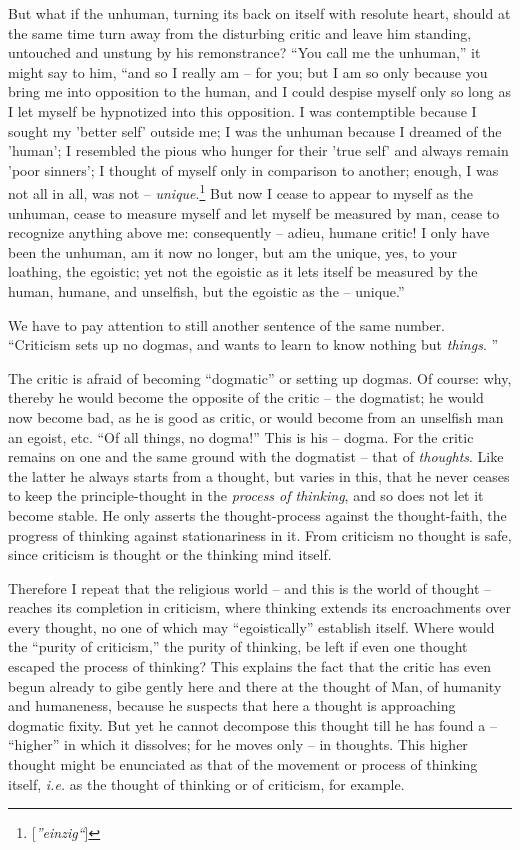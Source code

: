 But what if the unhuman, turning its back on itself with resolute heart, 
should at the same time turn away from the disturbing critic and leave him 
standing, untouched and unstung by his remonstrance? ``You call me the 
unhuman,'' it might say to him, ``and so I really am -- for you; but I am so 
only because you bring me into opposition to the human, and I could despise 
myself only so long as I let myself be hypnotized into this opposition. I was 
contemptible because I sought my 'better self' outside me; I was the unhuman 
because I dreamed of the 'human'; I resembled the pious who hunger for their 
'true self' and always remain 'poor sinners'; I thought of myself only in 
comparison to another; enough, I was not all in all, was not -- 
\textit{unique}.\footnote{[\textit{''einzig``}]} But now I cease to appear 
to myself as the unhuman, cease to measure myself and let myself be measured 
by man, cease to recognize anything above me: consequently -- adieu, humane 
critic! I only have been the unhuman, am it now no longer, but am the unique, 
yes, to your loathing, the egoistic; yet not the egoistic as it lets itself be 
measured by the human, humane, and unselfish, but the egoistic as the -- 
unique.''

We have to pay attention to still another sentence of the same number. 
``Criticism sets up no dogmas, and wants to learn to know nothing but 
\textit{things}. ''

The critic is afraid of becoming ``dogmatic'' or setting up dogmas. Of 
course: why, thereby he would become the opposite of the critic -- the 
dogmatist; he would now become bad, as he is good as critic, or would become 
from an unselfish man an egoist, etc. ``Of all things, no dogma!'' This is 
his -- dogma. For the critic remains on one and the same ground with the 
dogmatist -- that of \textit{thoughts}. Like the latter he always starts from 
a thought, but varies in this, that he never ceases to keep the 
principle-thought in the \textit{process of thinking}, and so does not let it 
become stable. He only asserts the thought-process against the thought-faith, 
the progress of thinking against stationariness in it. From criticism no 
thought is safe, since criticism is thought or the thinking mind itself.

Therefore I repeat that the religious world -- and this is the world of 
thought -- reaches its completion in criticism, where thinking extends its 
encroachments over every thought, no one of which may ``egoistically'' 
establish itself. Where would the ``purity of criticism,'' the purity of 
thinking, be left if even one thought escaped the process of thinking? This 
explains the fact that the critic has even begun already to gibe gently here 
and there at the thought of Man, of humanity and humaneness, because he 
suspects that here a thought is approaching dogmatic fixity. But yet he cannot 
decompose this thought till he has found a -- ``higher'' in which it 
dissolves; for he moves only -- in thoughts. This higher thought might be 
enunciated as that of the movement or process of thinking itself, 
\textit{i.e.} as the thought of thinking or of criticism, for example.

